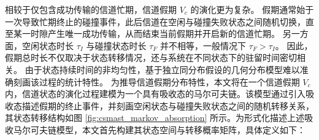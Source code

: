 相较于仅包含成功传输的信道忙期，信道假期 $V_c$ 的演化更为复杂。
假期通常始于一次导致忙期终止的碰撞事件，此后信道在空闲与碰撞失败状态之间随机切换，直至某一时隙产生唯一成功传输，从而结束当前假期并开启新的信道忙期。
另一方面，空闲状态时长 $\tau_I$ 与碰撞状态时长 $\tau_F$ 并不相等，一般情况下 $\tau_F > \tau_I$。
因此，假期总时长不仅取决于状态转移情况，还与系统在不同状态下的驻留时间密切相关。
由于状态持续时间的非均匀性，基于独立同分布假设的几何分布模型难以准确刻画该过程的统计特性。
为推导信道假期分布特性，本文将在一个信道假期 $V_c$ 内，信道状态的演化过程建模为一个具有吸收态的马尔可夫链。该模型通过引入吸收态描述假期的终止事件，并刻画空闲状态与碰撞失败状态之间的随机转移关系，其状态转移结构如图 \ref{fig:csmast_markov_absorption} 所示。为形式化描述上述吸收马尔可夫链模型，本文首先构建其状态空间与转移概率矩阵，具体定义如下：

